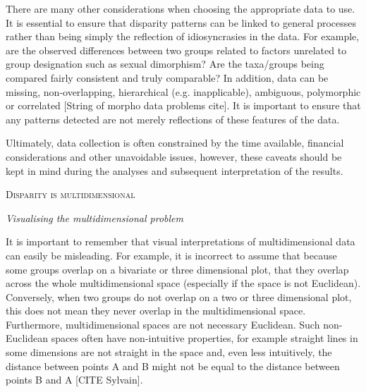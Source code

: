 \documentclass[12pt,letterpaper]{article}
\renewcommand{\section}[1]{%
\bigskip
\begin{center}
\begin{Large}
\normalfont\scshape #1
\medskip
\end{Large}
\end{center}}
\renewcommand{\subsection}[1]{%
\bigskip
\begin{center}
\begin{large}
\normalfont\itshape #1
\end{large}
\end{center}}
\begin{document}
There are many other considerations when choosing the appropriate data to use. 
It is essential to ensure that disparity patterns can be linked to general processes rather than being simply the reflection of idiosyncrasies in the data.
For example, are the observed differences between two groups related to factors unrelated to group designation such as sexual dimorphism?
Are the taxa/groups being compared fairly consistent and truly comparable?
In addition, data can be missing, non-overlapping, hierarchical (e.g. inapplicable), ambiguous, polymorphic or correlated [String of morpho data problems cite].
It is important to ensure that any patterns detected are not merely reflections of these features of the data.

Ultimately, data collection is often constrained by the time available, financial considerations and other unavoidable issues, however, these caveats should be kept in mind during the analyses and subsequent interpretation of the results.

\section{Disparity is multidimensional}
\subsection{Visualising the multidimensional problem}
\label{visualisation}
It is important to remember that visual interpretations of multidimensional data can easily be misleading.
For example, it is incorrect to assume that because some groups overlap on a bivariate or three dimensional plot, that they overlap across the whole multidimensional space (especially if the space is not Euclidean).
Conversely, when two groups do not overlap on a two or three dimensional plot, this does not mean they never overlap in the multidimensional space.
Furthermore, multidimensional spaces are not necessary Euclidean.
Such non-Euclidean spaces often have non-intuitive properties, for example straight lines in some dimensions are not straight in the space and, even less intuitively, the distance between points A and B might not be equal to the distance between points B and A [CITE Sylvain].
\end{document}

